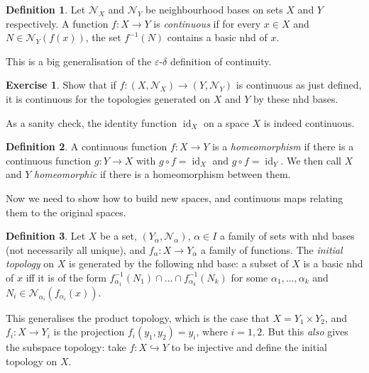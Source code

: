 \documentclass{tufte-handout}
\def\into {\hookrightarrow}
\def\cN {\mathcal{N}}
\DeclareMathOperator{\id}{id}
\theoremstyle{definition}
\newtheorem{definition}{Definition}
\newtheorem{ex}{Exercise}
\begin{document}
\begin{definition} 
Let $\cN_X$ and $\cN_Y$ be neighbourhood bases on sets $X$ and $Y$ 
respectively. A function $f\colon X\to Y$ is \emph{continuous} if for every $x\in X$ and 
$N\in \cN_Y(f(x))$, the set $f^{-1}(N)$ contains a basic nhd of $x$. 
\end{definition}

This is a big generalisation of the $\varepsilon$-$\delta$ definition of continuity.

\begin{ex} 
Show that if $f\colon (X,\cN_X)\to (Y,\cN_Y)$ is 
continuous as just defined, it is continuous for the topologies generated on $X$ and $Y$ by 
these nhd bases. 
\end{ex}

As a sanity check, the identity function 
$\id_X$ on a space $X$ is indeed continuous.

\begin{definition}
A continuous function $f\colon X\to Y$ is a \emph{homeomorphism} if there is a continuous 
function $g\colon Y\to X$ with $g\circ f = \id_X$ and $g\circ f = \id_Y$. 
We then call $X$ and $Y$ \emph{homeomorphic}
 if there is a homeomorphism between them.
\end{definition}


Now we need to show how to build new spaces, and continuous maps relating them to the 
original spaces.

\begin{definition} 
Let $X$ be a set, $(Y_\alpha,\cN_\alpha)$, $\alpha \in I$ a family of 
sets with nhd bases (not necessarily all unique), and $f_\alpha\colon X\to Y_\alpha$ a 
family of functions. The \emph{initial topology} on $X$ is generated by the following nhd 
base: a subset of $X$ is a basic nhd of $x$ iff 
 it is of the form $f_{\alpha_1}^{-1}(N_1) \cap \ldots \cap f_{\alpha_k}^{-1}(N_k)$ for 
some $\alpha_1,\ldots,\alpha_k$ and $N_i \in \cN_{\alpha_i}(f_{\alpha_i}(x))$. 
\end{definition}

This generalises the product topology, which is the case that $X = Y_1 \times Y_2$, and 
$f_i\colon X\to Y_i$ is the projection $f_i(y_1,y_2) = y_i$, where $i=1,2$. But this 
\emph{also} gives the subspace topology: take $f\colon X\into Y$ to be injective and define 
the initial topology on $X$.
\end{document}
